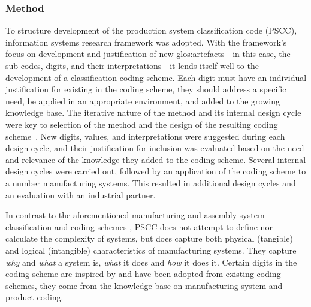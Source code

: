 \subsubsection*{Method}
To structure development of the production system classification code (PSCC),  information systems research framework was adopted.
With the framework's focus on development and justification of new \gls{glos:artefact}s---in this case, the sub-codes, digits, and their interpretations---it lends itself well to the development of a classification coding scheme.
Each digit must have an individual justification for existing in the coding scheme, they should address a specific need, be applied in an appropriate environment, and added to the growing knowledge base.
The iterative nature of the method and its internal design cycle were key to selection of the method and the design of the resulting coding scheme~\parencite{Hevner2007TheTC}.
New digits, values, and interpretations were suggested during each design cycle, and their justification for inclusion was evaluated based on the need and relevance of the knowledge they added to the coding scheme.
Several internal design cycles were carried out, followed by an application of the coding scheme to a number manufacturing systems.
This resulted in additional design cycles and an evaluation with an industrial partner.

In contrast to the aforementioned manufacturing and assembly system classification and coding schemes \parencite{ElMaraghy2006Complexity,Samy2012}, PSCC does not attempt to define nor calculate the complexity of systems, but does capture both physical (tangible) and logical (intangible) characteristics of manufacturing systems.
They capture \emph{why} and \emph{what} a system is, \emph{what} it does and \emph{how} it does it.
Certain digits in the coding scheme are inspired by and have been adopted from existing coding schemes, \ie{} they come from the knowledge base on manufacturing system and product coding.

